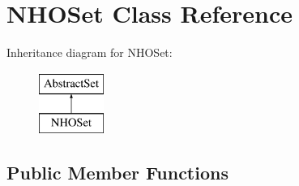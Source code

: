 \hypertarget{classNHOSet}{\section{N\-H\-O\-Set Class Reference}
\label{classNHOSet}
}
Inheritance diagram for N\-H\-O\-Set\-:\begin{figure}[H]
\begin{center}
\leavevmode
\includegraphics[height=2.000000cm]{classNHOSet}
\end{center}
\end{figure}
\subsection*{Public Member Functions}
